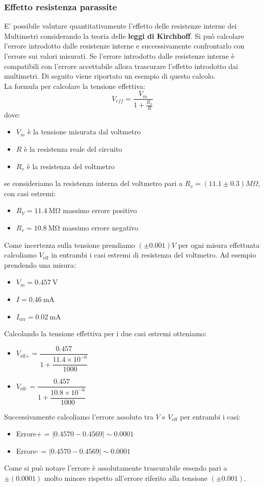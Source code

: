 \documentclass[letterpaper,12pt]{article}
\begin{document}
\subsubsection{Effetto resistenza parassite}
E' possibile valutare quantitativamente l'effetto delle resistenze interne dei Multimetri considerando la teoria delle \textbf{leggi di Kirchhoff}. Si può calcolare l'errore introdotto dalle resistenze interne e successivamente confrontarlo con l'errore sui valori misurati. Se l'errore introdotto dalle resistenze interne è compatibili con l'errore accettabile allora trascurare l'effetto introdotto dai multimetri.
Di seguito viene riportato un esempio di questo calcolo.\\
La formula per calcolare la tensione effettiva:
\begin{equation}
    V_{eff}= \frac{V_m}{1+\frac{R_v}{R}}
    \label{Tensione considerando R interna voltmetro}
\end{equation}
dove:
\begin{itemize}
    \item $V_m$ è la tensione misurata dal voltmetro
    \item $R$ è la resistenza reale del circuito 
    \item $R_v$ è la resistenza del voltmetro 
\end{itemize}
se consideriamo la resistenza interna del voltmetro pari a $R_v=(11.1\pm0.3) M\Omega$, con casi estremi:
\begin{itemize}
    \item $R_V = \SI{11.4}{\mega\ohm}$ massimo errore positivo
    \item $R_v = \SI{10.8}{\mega\ohm}$ massimo errore negativo
\end{itemize}
Come incertezza  sulla tensione prendiamo $(\pm0.001)V$ per ogni misura effettuata calcoliamo $V_\text{eff}$ in entrambi i casi estremi di resistenza del voltmetro. 
Ad esempio prendendo una misura:
\begin{itemize}
    \item $V_m = \SI{0.457}{\volt}$
    \item $I = \SI{0.46}{\milli\ampere}$
    \item $I_\text{err}=\SI{0.02}{\milli\ampere} $
\end{itemize}
Calcolando la tensione effettiva per i due casi estremi otteniamo:
\begin{itemize}
    \item \( V_\text{eff+}= \dfrac{0.457}{1+\dfrac{11.4 \times 10^{-6}}{1000}} \)
    \item \( V_\text{eff-}= \dfrac{0.457}{1+\dfrac{10.8 \times 10^{-6}}{1000}} \)
\end{itemize}
Successivamente calcoliamo l'errore assoluto tra $V$ e $V_\text{eff}$ per entrambi i casi:
\begin{itemize}
    \item Errore+ = $|0.4570 - 0.4569| \sim 0.0001$
    \item Errore- = $|0.4570 - 0.4569| \sim 0.0001$
\end{itemize}
Come si può notare l'errore è assolutamente trascurabile essendo pari a $\pm(0.0001)$ molto minore rispetto all'errore riferito alla tensione $(\pm0.001)$.
\\
\end{document}
